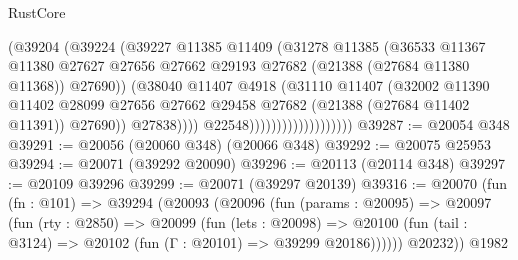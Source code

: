\begin{lexlean}{RustCore}
\begin{coremodule}
                                          (@39204
                                            (@39224
                                              (@39227
                                                @11385
                                                @11409
                                                (@31278
                                                  @11385
                                                  (@36533
                                                    @11367
                                                    @11380
                                                    @27627
                                                    @27656
                                                    @27662
                                                    @29193
                                                    @27682
                                                    (@21388 (@27684 @11380 @11368))
                                                    @27690))
                                                (@38040
                                                  @11407
                                                  @4918
                                                  (@31110
                                                    @11407
                                                    (@32002
                                                      @11390
                                                      @11402
                                                      @28099
                                                      @27656
                                                      @27662
                                                      @29458
                                                      @27682
                                                      (@21388 (@27684 @11402 @11391))
                                                      @27690))
                                                  @27838))))
                                          @22548)))))))))))))))))))
@39287 := @20054 @348
@39291 := @20056 (@20060 @348) (@20066 @348)
@39292 := @20075 @25953
@39294 := @20071 (@39292 @20090)
@39296 := @20113 (@20114 @348)
@39297 := @20109 @39296
@39299 := @20071 (@39297 @20139)
@39316 := @20070
    (fun (fn : @101) =>
    @39294
      (@20093
        (@20096
          (fun (params : @20095) =>
          @20097
            (fun (rty : @2850) =>
            @20099
              (fun (lets : @20098) =>
              @20100 (fun (tail : @3124) => @20102 (fun (Γ : @20101) => @39299 @20186))))))
        @20232))
    @1982

\end{coremodule}
\end{lexlean}
